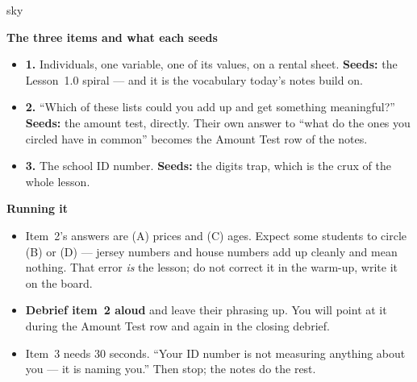 \documentclass[10pt]{article}
\begin{document}
\boxguard[20]
\begin{skillbox}{sky}
\begin{minipage}[t]{0.48\linewidth}
    \textbf{The three items and what each seeds}
    \begin{itemize}
        \item \textbf{1.} Individuals, one variable, one of its values, on a rental sheet.
              \textbf{Seeds:} the Lesson~1.0 spiral --- and it is the vocabulary today's notes
              build on.
        \item \textbf{2.} ``Which of these lists could you add up and get something meaningful?''
              \textbf{Seeds:} the amount test, directly. Their own answer to ``what do the ones
              you circled have in common'' becomes the Amount Test row of the notes.
        \item \textbf{3.} The school ID number. \textbf{Seeds:} the digits trap, which is the
              crux of the whole lesson.
    \end{itemize}
\end{minipage}
\hfill
\begin{minipage}[t]{0.48\linewidth}
    \textbf{Running it}
    \begin{itemize}
        \item Item~2's answers are (A) prices and (C) ages. Expect some students to circle (B)
              or (D) --- jersey numbers and house numbers add up cleanly and mean nothing. That
              error \emph{is} the lesson; do not correct it in the warm-up, write it on the board.
        \item \textbf{Debrief item~2 aloud} and leave their phrasing up. You will point at it
              during the Amount Test row and again in the closing debrief.
        \item Item~3 needs 30 seconds. ``Your ID number is not measuring anything about you ---
              it is naming you.'' Then stop; the notes do the rest.
    \end{itemize}
\end{minipage}
\end{skillbox}
\end{document}
